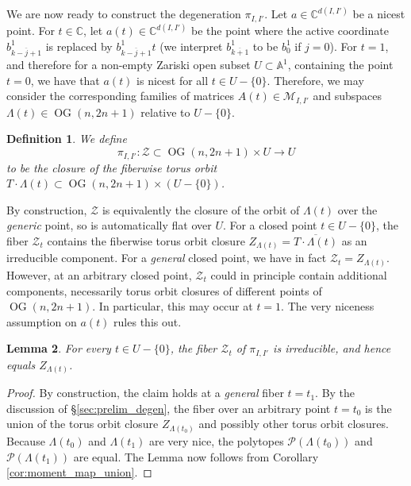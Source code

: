 \documentclass[12pt]{amsart}
\newtheorem{definition}{Definition}[subsection]
\newtheorem{lemma}[definition]{Lemma}
\DeclareMathOperator{\OG}{OG}
\newcommand{\bA}{\mathbb{A}}
\newcommand{\bC}{\mathbb{C}}
\newcommand{\cM}{\mathcal{M}}
\newcommand{\cP}{\mathcal{P}}
\newcommand{\cZ}{\mathcal{Z}}
\begin{document}
We are now ready to construct the degeneration $\pi_{I,I'}$. Let $a\in\bC^{d(I,I')}$ be a nicest point. For $t\in\bC$, let $a(t)\in \bC^{d(I,I')}$ be the point where the active coordinate $b^1_{\overline{k-j+1}}$ is replaced by $b^1_{\overline{k-j+1}}t$ (we interpret $b^1_{\overline{k+1}}$ to be $b^1_0$ if $j=0$). For $t=1$, and therefore for a non-empty Zariski open subset $U\subset \bA^1$, containing the point $t=0$, we have that $a(t)$ is nicest for all $t\in U-\{0\}$. Therefore, we may consider the corresponding families of matrices $A(t)\in\cM_{I,I'}$ and subspaces $\Lambda(t)\in\OG(n,2n+1)$ relative to $U-\{0\}$.

\begin{definition}
We define
    \begin{equation*}
        \pi_{I,I'}:\cZ\subset\OG(n,2n+1)\times U\to U
    \end{equation*}
    to be the closure of the fiberwise torus orbit $T\cdot \Lambda(t)\subset \OG(n,2n+1)\times (U-\{0\})$.
\end{definition}

By construction, $\cZ$ is equivalently the closure of the orbit of $\Lambda(t)$ over the \emph{generic} point, so is automatically flat over $U$. For a closed point $t\in U-\{0\}$, the fiber $\cZ_t$ contains the fiberwise torus orbit closure $Z_{\Lambda(t)}=\overline{T\cdot \Lambda(t)}$ as an irreducible component. For a \emph{general} closed point, we have in fact $\cZ_t=Z_{\Lambda(t)}$. However, at an arbitrary closed point, $\cZ_t$ could in principle contain additional components, necessarily torus orbit closures of different points of $\OG(n,2n+1)$. In particular, this may occur at $t=1$. The very niceness assumption on $a(t)$ rules this out.

\begin{lemma}\label{lem:very_nice_implies_irreducible}
    For every $t\in U-\{0\}$, the fiber $\cZ_t$ of $\pi_{I,I'}$ is irreducible, and hence equals $Z_{\Lambda(t)}$.
\end{lemma}

\begin{proof}
    By construction, the claim holds at a \emph{general} fiber $t=t_1$. By the discussion of \S\ref{sec:prelim_degen}, the fiber over an arbitrary point $t=t_0$ is the union of the torus orbit closure $Z_{\Lambda(t_0)}$ and possibly other torus orbit closures. Because $\Lambda(t_0)$ and $\Lambda(t_1)$ are very nice, the polytopes $\cP(\Lambda(t_0))$ and $\cP(\Lambda(t_1))$ are equal. The Lemma now follows from Corollary \ref{cor:moment_map_union}.
\end{proof}
\end{document}
